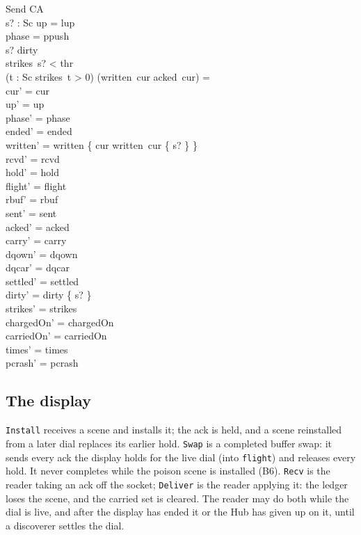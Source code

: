 \documentclass[a4paper,10pt,fleqn]{article}
\begin{document}
\begin{schema}{Send}
  \Delta CA \\
  s? : Sc
\where
  up = lup \\
  phase = ppush \\
  s? \in dirty \\
  strikes~s? < thr \\
  (\exists t : Sc \spot strikes~t > 0) \implies (written~cur \setminus acked~cur) = \emptyset \\
  cur' = cur \\
  up' = up \\
  phase' = phase \\
  ended' = ended \\
  written' = written \oplus \{ cur \mapsto written~cur \cup \{ s? \} \} \\
  rcvd' = rcvd \\
  hold' = hold \\
  flight' = flight \\
  rbuf' = rbuf \\
  sent' = sent \\
  acked' = acked \\
  carry' = carry \\
  dqown' = dqown \\
  dqcar' = dqcar \\
  settled' = settled \\
  dirty' = dirty \setminus \{ s? \} \\
  strikes' = strikes \\
  chargedOn' = chargedOn \\
  carriedOn' = carriedOn \\
  times' = times \\
  pcrash' = pcrash
\end{schema}

\subsection{The display}

\texttt{Install} receives a scene and installs it; the ack is held, and a scene
reinstalled from a later dial replaces its earlier hold.  \texttt{Swap} is a
completed buffer swap: it sends every ack the display holds for the live dial
(into \texttt{flight}) and releases every hold.  It never completes while the
poison scene is installed (B6).  \texttt{Recv} is the reader taking an ack off the socket;
\texttt{Deliver} is the reader applying it: the ledger loses the scene, and the
carried set is cleared.  The reader may do both while the dial is live, and
after the display has ended it or the Hub has given up on it, until a
discoverer settles the dial.
\end{document}
